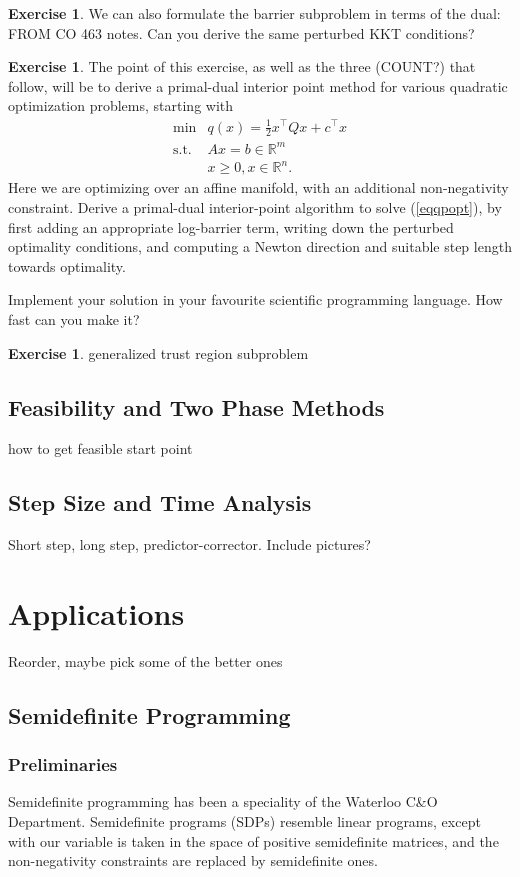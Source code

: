 \documentclass[11pt]{article}
\numberwithin{equation}{section}
\theoremstyle{definition}
\newtheorem{exercise}[theorem]{Exercise}
\newcommand{\bR}{\mathbb{R}}
\newcommand{\tst}{\text{s.t.}}
\begin{document}
\begin{exercise}
    We can also formulate the barrier subproblem in terms of the dual: FROM CO 463 notes. Can you derive the same perturbed KKT conditions?
\end{exercise}
\begin{exercise}
    The point of this exercise, as well as the three (COUNT?) that follow, will be to derive a primal-dual interior point method for various quadratic optimization problems, starting with
    \begin{equation}
    \label{eqqpopt}
    \begin{array}{cc}
         \min & q(x)=\frac12x^\top Qx +c^\top x \\
         \tst & Ax=b\in\bR^m\\
              & x\ge 0, x\in\bR^n.
    \end{array}
    \end{equation}
    Here we are optimizing over an affine manifold, with an additional non-negativity constraint. Derive a primal-dual interior-point algorithm to solve (\ref{eqqpopt}), by first adding an appropriate log-barrier term, writing down the perturbed optimality conditions, and computing a Newton direction and suitable step length towards optimality.
    
    Implement your solution in your favourite scientific programming language. How fast can you make it?
\end{exercise}
\begin{exercise}
    generalized trust region subproblem
\end{exercise}
\subsection{Feasibility and Two Phase Methods}
how to get feasible start point
\subsection{Step Size and Time Analysis}
Short step, long step, predictor-corrector. Include pictures?
\section{Applications}
Reorder, maybe pick some of the better ones
\subsection{Semidefinite Programming}
\subsubsection{Preliminaries}
Semidefinite programming has been a speciality of the Waterloo C\&O Department. Semidefinite programs (SDPs) resemble linear programs, except with our variable is taken in the space of positive semidefinite matrices, and the non-negativity constraints are replaced by semidefinite ones.
\end{document}
